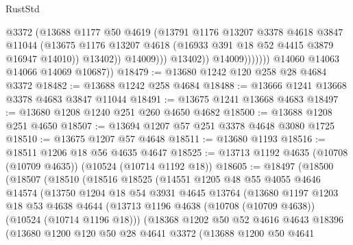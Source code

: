 \begin{lexlean}{RustStd}
\begin{coremodule}
                                @3372
                                (@13688
                                  @1177
                                  @50
                                  @4619
                                  (@13791
                                    @1176
                                    @13207
                                    @3378
                                    @4618
                                    @3847
                                    @11044
                                    (@13675
                                      @1176
                                      @13207
                                      @4618
                                      (@16933 @391 @18 @52 @4415 @3879 @16947 @14010))
                                    @13402))
                                @14009)))
                          @13402))
                      @14009)))))))
        @14060
        @14063
        @14066
        @14069
        @10687))
@18479 := @13680 @1242 @120 @258 @28 @4684 @3372
@18482 := @13688 @1242 @258 @4684
@18488 := @13666 @1241 @13668 @3378 @4683 @3847 @11044
@18491 := @13675 @1241 @13668 @4683
@18497 := @13680 @1208 @1240 @251 @260 @4650 @4682
@18500 := @13688 @1208 @251 @4650
@18507 := @13694 @1207 @57 @251 @3378 @4648 @3080 @1725
@18510 := @13675 @1207 @57 @4648
@18511 := @13680 @1193
@18516 := @18511 @1206 @18 @56 @4635 @4647
@18525 := @13713 @1192 @4635 (@10708 (@10709 @4635)) (@10524 (@10714 @1192 @18))
@18605 := @18497
    (@18500
      (@18507
        (@18510
          (@18516
            @18525
            (@14551
              @1205
              @48
              @55
              @4055
              @4646
              @14574
              (@13750
                @1204
                @18
                @54
                @3931
                @4645
                @13764
                (@13680
                  @1197
                  @1203
                  @18
                  @53
                  @4638
                  @4644
                  (@13713 @1196 @4638 (@10708 (@10709 @4638)) (@10524 (@10714 @1196 @18)))
                  (@18368
                    @1202
                    @50
                    @52
                    @4616
                    @4643
                    @18396
                    (@13680
                      @1200
                      @120
                      @50
                      @28
                      @4641
                      @3372
                      (@13688
                        @1200
                        @50
                        @4641

\end{coremodule}
\end{lexlean}
